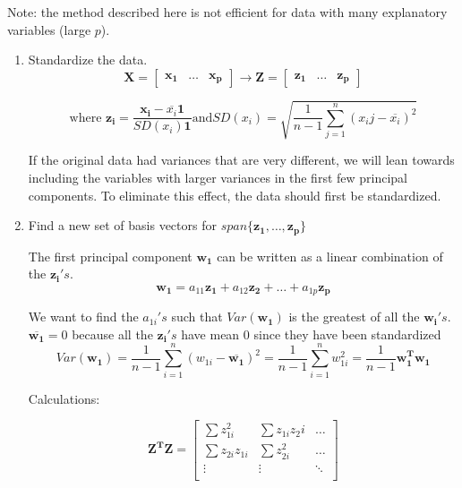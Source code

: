 \documentclass{article}
\begin{document}
Note: the method described here is not efficient for data with many explanatory variables (large $p$). 

\begin{enumerate}
    \item Standardize the data. 
    $$
    \boldsymbol{X} = 
    \begin{bmatrix}
    \boldsymbol{x_1} & \dots & \boldsymbol{x_p}
\end{bmatrix} \rightarrow 
\boldsymbol{Z} = 
    \begin{bmatrix}
    \boldsymbol{z_1} & \dots & \boldsymbol{z_p}
\end{bmatrix} 
    $$
    
    $$
    \text{where } \boldsymbol{z_i} = \frac{\boldsymbol{x_i} - \overline{x_i}\boldsymbol{1}}{SD(x_i)\boldsymbol{1}} \text{and} SD(x_i) = \sqrt{\frac{1}{n-1}\sum_{j=1}^n (x_ij - \overline{x_i})^2}
    $$
    
   If the original data had variances that are very different, we will lean towards including the variables with larger variances in the first few principal components. To eliminate this effect, the data should first be standardized.
   
   \item Find a new set of basis vectors for $span\{\boldsymbol{z_1}, \ldots, \boldsymbol{z_p}\}$ 

    The first principal component $\boldsymbol{w_1}$ can be written as a linear combination of the $\boldsymbol{z_i}'s$. 
    $$
    \boldsymbol{w_1} = a_{11}\boldsymbol{z_1} + a_{12}\boldsymbol{z_2} + \ldots + a_{1p}\boldsymbol{z_p}
    $$
    
    \noindent We want to find the $a_{1i}'s$ such that $Var(\boldsymbol{w_1})$ is the greatest of all the $\boldsymbol{w_i}'s$.\\
    
    $\overline{\boldsymbol{w_1}} = 0$ because all the $\boldsymbol{z_i}'s$ have mean $0$ since they have been standardized\\
    
    $$Var(\boldsymbol{w_1}) = \frac{1}{n-1}\sum_{i=1}^n (w_{1i} - \overline{\boldsymbol{w_1}})^2 = \frac{1}{n-1}\sum_{i=1}^n w_{1i}^2 = \frac{1}{n-1}\boldsymbol{w_1^T w_1}$$
    


Calculations:

$$
\boldsymbol{Z^T}\boldsymbol{Z} = 
\begin{bmatrix}
\sum z_{1i}^2 & \sum z_{1i}z_2i & \ldots \\
\sum z_{2i}z_{1i} & \sum z_{2i}^2 & \ldots \\
\vdots & \vdots & \ddots \\
\end{bmatrix}
$$


\end{enumerate}
\end{document}
